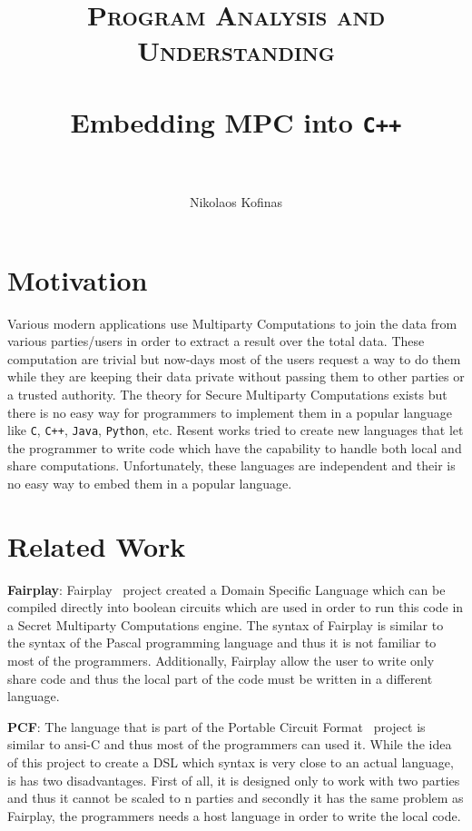 \documentclass[paper=a4, fontsize=11pt]{scrartcl} %
\title{	
\vspace*{-2cm}
\normalfont \normalsize 
\textsc{Program Analysis and Understanding} \\ [10pt] %
\horrule{0.2pt} \\[0.2cm] %
\huge Embedding MPC into {\tt C++} \\ %
\horrule{2pt} \\[0.2cm] %
}
\author{Nikolaos Kofinas} %
\date{}%
\numberwithin{equation}{section} %
\numberwithin{figure}{section} %
\numberwithin{table}{section} %
\begin{document}
\maketitle %

\section{Motivation}

Various modern applications use Multiparty Computations to join the data from various parties/users in order to extract a result over the total data. These computation are trivial but now-days most of the users request a way to do them while they are keeping their data private without passing them to other parties or a trusted authority. The theory for Secure Multiparty Computations exists but there is no easy way for programmers to implement them in a popular language like {\tt C}, {\tt C++}, {\tt Java}, {\tt Python}, etc. Resent works tried to create new languages that let the programmer to write code which have the capability to handle both local and share computations. Unfortunately, these languages are independent and their is no easy way to embed them in a popular language. 

\section{Related Work}

\noindent
\textbf{Fairplay}: Fairplay~\cite{Fairplay} project created a Domain Specific Language which can be compiled directly into boolean circuits which are used in order to run this code in a Secret Multiparty Computations engine. The syntax of Fairplay is similar to the syntax of the Pascal programming language and thus it is not familiar to most of the programmers. Additionally, Fairplay allow the user to write only share code and thus the local part of the code must be written in a different language. 

\noindent
\textbf{PCF}: The language that is part of the Portable Circuit Format~\cite{Ansi-c} project is similar to ansi-C and thus most of the programmers can used it. While the idea of this project to create a DSL which syntax is very close to an actual language, is has two disadvantages. First of all, it is designed only to work with two parties and thus it cannot be scaled to n parties and secondly it has the same problem as Fairplay, the programmers needs a host language in order to write the local code.
\end{document}
